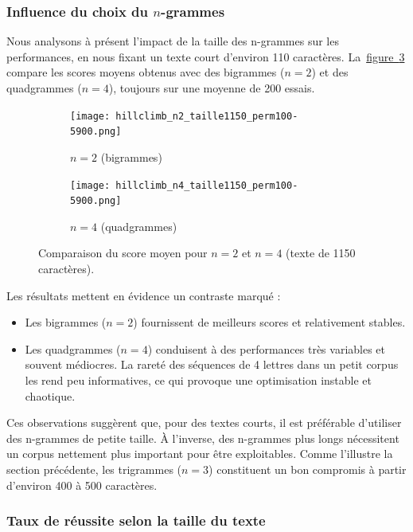 \documentclass[a4paper]{article}
\newcommand{\figref}[1]{\hyperref[#1]{figure~\ref*{#1}}}
\begin{document}
\subsubsection{Influence du choix du $n$-grammes}

Nous analysons à présent l’impact de la taille des n-grammes sur les performances, en nous fixant un texte court d’environ 110 caractères. La~\figref{fig:ngrams-1150} compare les scores moyens obtenus avec des bigrammes ($n=2$) et des quadgrammes ($n=4$), toujours sur une moyenne de 200 essais.


\begin{figure}[H]
    \centering
    \begin{subfigure}[b]{0.49\textwidth}
        \texttt{[image: hillclimb\_n2\_taille1150\_perm100-5900.png]}
        \caption{$n = 2$ (bigrammes)}
        \label{fig:n2-110}
    \end{subfigure}
    \hfill
    \begin{subfigure}[b]{0.49\textwidth}
        \texttt{[image: hillclimb\_n4\_taille1150\_perm100-5900.png]}
        \caption{$n = 4$ (quadgrammes)}
        \label{fig:n4-110}
    \end{subfigure}
    \caption{Comparaison du score moyen pour $n = 2$ et $n = 4$ (texte de 1150 caractères).}
    \label{fig:ngrams-1150}
\end{figure}
Les résultats mettent en évidence un contraste marqué :

\begin{itemize}
    \item Les bigrammes ($n=2$) fournissent de meilleurs scores et relativement stables.
    \item Les quadgrammes ($n=4$) conduisent à des performances très variables et souvent médiocres. La rareté des séquences de 4 lettres dans un petit corpus les rend peu informatives, ce qui provoque une optimisation instable et chaotique.
\end{itemize}

Ces observations suggèrent que, pour des textes courts, il est préférable d’utiliser des n-grammes de petite taille. À l’inverse, des n-grammes plus longs nécessitent un corpus nettement plus important pour être exploitables. Comme l’illustre la section précédente, les trigrammes ($n=3$) constituent un bon compromis à partir d’environ 400 à 500 caractères.

\subsubsection{Taux de réussite selon la taille du texte}
\end{document}
